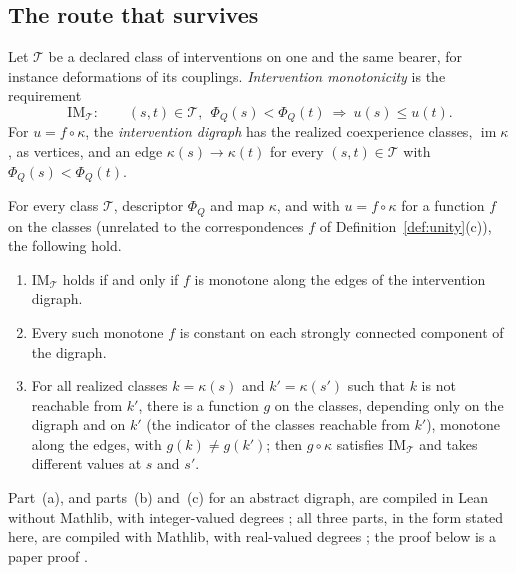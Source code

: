 \subsection{The route that survives}\label{sec:im}
Let $\mathcal T$ be a declared class of interventions on one and the same bearer, for instance deformations of its couplings. \emph{Intervention monotonicity} is the requirement
\begin{equation}\label{eq:im}
\mathrm{IM}_{\mathcal T}:\qquad (s,t)\in\mathcal T,\ \ \Phi_Q(s)<\Phi_Q(t)\ \Longrightarrow\ u(s)\le u(t).
\end{equation}
For $u=f\circ\kappa$, the \emph{intervention digraph} has the realized coexperience classes, $\operatorname{im}\kappa$, as vertices, and an edge $\kappa(s)\to\kappa(t)$ for every $(s,t)\in\mathcal T$ with $\Phi_Q(s)<\Phi_Q(t)$.
\begin{theorem}\label{thm:frontier}
For every class $\mathcal T$, descriptor $\Phi_Q$ and map $\kappa$, and with $u=f\circ\kappa$ for a function $f$ on the classes (unrelated to the correspondences $f$ of Definition~\ref{def:unity}(c)), the following hold.
\begin{enumerate}
\item[(a)] $\mathrm{IM}_{\mathcal T}$ holds if and only if $f$ is monotone along the edges of the intervention digraph.
\item[(b)] Every such monotone $f$ is constant on each strongly connected component of the digraph.
\item[(c)] For all realized classes $k=\kappa(s)$ and $k'=\kappa(s')$ such that $k$ is not reachable from $k'$, there is a function $g$ on the classes, depending only on the digraph and on $k'$ (the indicator of the classes reachable from $k'$), monotone along the edges, with $g(k)\ne g(k')$; then $g\circ\kappa$ satisfies $\mathrm{IM}_{\mathcal T}$ and takes different values at $s$ and $s'$.
\end{enumerate}
Part~(a), and parts~(b) and~(c) for an abstract digraph, are compiled in Lean without Mathlib, with integer-valued degrees \stL; all three parts, in the form stated here, are compiled with Mathlib, with real-valued degrees \stM; the proof below is a paper proof \stA.
\end{theorem}
